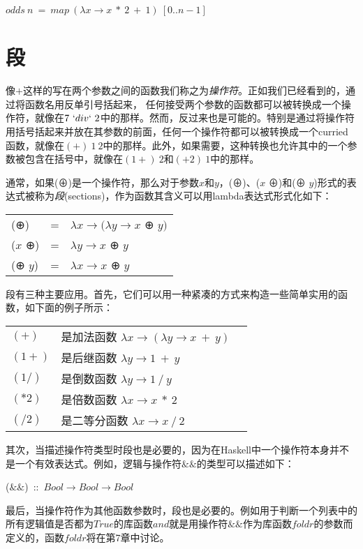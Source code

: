 \noindent\hspace*{1cm} $odds~n~=~map~(\lambda x \rightarrow x~*~2~+~1)~[0..n-1]$

\section{段}
像$+$这样的写在两个参数之间的函数我们称之为\textit{操作符}。正如我们已经看到的，通过将函数名用反单引号括起来， 任何接受两个参数的函数都可以被转换成一个操作符，就像在$7~`div`~2$中的那样。然而，反过来也是可能的。特别是通过将操作符用括号括起来并放在其参数的前面，任何一个操作符都可以被转换成一个curried函数，就像在$(+)~1~2$中的那样。此外，如果需要，这种转换也允许其中的一个参数被包含在括号中，就像在$(1+)~2$和$(+2)~1$中的那样。

通常，如果(⊕)是一个操作符，那么对于参数$x$和$y$，(⊕)、($x$ ⊕)和(⊕
$y$)形式的表达式被称为\textit{段}(sections)，作为函数其含义可以用lambda表达式形式化如下：

\begin{tabular}[t]{lll}
(⊕)&=&$\lambda x \rightarrow (\lambda y \rightarrow x$ ⊕ $y)$\\
($x$ ⊕)&=&$\lambda y \rightarrow x $ ⊕ $y$\\
(⊕ $y$)&=&$\lambda x \rightarrow x $ ⊕ $y$\\
\end{tabular}

段有三种主要应用。首先，它们可以用一种紧凑的方式来构造一些简单实用的函数，如下面的例子所示：

\begin{tabular}[t]{lll}
$(+)$&是加法函数 $\lambda x \rightarrow (\lambda y \rightarrow x~+~y)$\\
$(1+)$&是后继函数 $\lambda y \rightarrow 1~+~y$\\
$(1/)$&是倒数函数 $\lambda y \rightarrow 1~/~y$\\
$(*2)$&是倍数函数 $\lambda x \rightarrow x~*~2$\\
$(/2)$&是二等分函数 $\lambda x \rightarrow x~/~2$\\
\end{tabular}


其次，当描述操作符类型时段也是必要的，因为在Haskell中一个操作符本身并不是一个有效表达式。例如，逻辑与操作符$\&\&$的类型可以描述如下：

\noindent\hspace*{1cm} ($\&\&$)~::~$Bool \rightarrow Bool \rightarrow Bool$

最后，当操作符作为其他函数参数时，段也是必要的。例如用于判断一个列表中的所有逻辑值是否都为$True$的库函数$and$就是用操作符$\&\&$作为库函数$foldr$的参数而定义的，函数$foldr$将在第7章中讨论。

